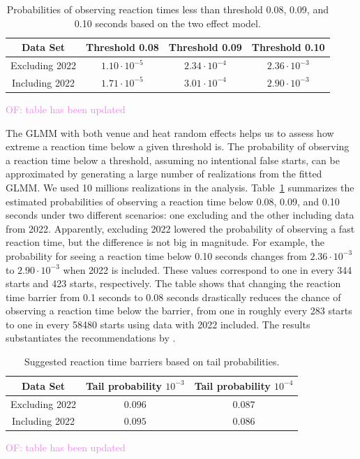 \documentclass[12pt, letterpaper]{article}
\newcommand{\of}[1]{\textcolor{violet}{OF: #1}}
\begin{document}
\begin{table}
  \centering
  \caption{Probabilities of observing reaction times less than threshold 0.08,
  0.09, and 0.10 seconds based on the two effect model.}
  \begin{tabular}{c c c c} 
   \toprule
   Data Set & Threshold 0.08 & Threshold 0.09 & Threshold 0.10  \\ 
   \midrule
   Excluding 2022 & $1.10\cdot10^{-5}$ & $2.34\cdot10^{-4}$ &  $2.36\cdot10^{-3}$  \\ 
   Including 2022 & $1.71\cdot10^{-5}$ & $3.01\cdot10^{-4}$ & $2.90\cdot10^{-3}$ \\
   \bottomrule
  \end{tabular}
  \label{tab:Sim_probability}
\end{table}
\of{table has been updated}

The GLMM with both venue and heat random effects helps us to assess how extreme
a reaction time below a given threshold is. The probability of observing a reaction
time below a threshold, assuming no intentional false starts, can be
approximated by generating a large number of realizations from the fitted
GLMM. We used 10 millions realizations in the analysis. 
Table~\ref{tab:Sim_probability} summarizes the estimated probabilities of
observing a reaction time below 0.08, 0.09, and 0.10 seconds under two different
scenarios: one excluding and the other including data from 2022. Apparently,
excluding 2022 lowered the probability of observing a fast reaction time, but
the difference is not big in magnitude. For example, the probability for
seeing a reaction time below 0.10 seconds changes from $2.36\cdot 10^{-3}$ to
$2.90\cdot 10^{-3}$ when 2022 is included. These values correspond to one in
every 344 starts and 423 starts, respectively. The table shows that changing the
reaction time barrier from 0.1 seconds to 0.08 seconds drastically reduces the
chance of observing a reaction time below the barrier, from one in roughly every
283 starts to one in every 58480 starts using data with 2022 included. The
results substantiates the recommendations by \citet{komi2009iaaf}.


\begin{table}
  \centering
  \caption{Suggested reaction time barriers based on tail probabilities.}
  \begin{tabular}{c c c} 
   \toprule
   Data Set & Tail probability  $10^{-3}$ & Tail probability $10^{-4}$ \\ 
   \midrule
   Excluding 2022 & $0.096$ & $0.087$ \\ 
   Including 2022 & $0.095$ & $0.086$ \\
   \bottomrule
  \end{tabular}
  \label{tab:Sim_time}
\end{table}
\of{table has been updated}
\end{document}
